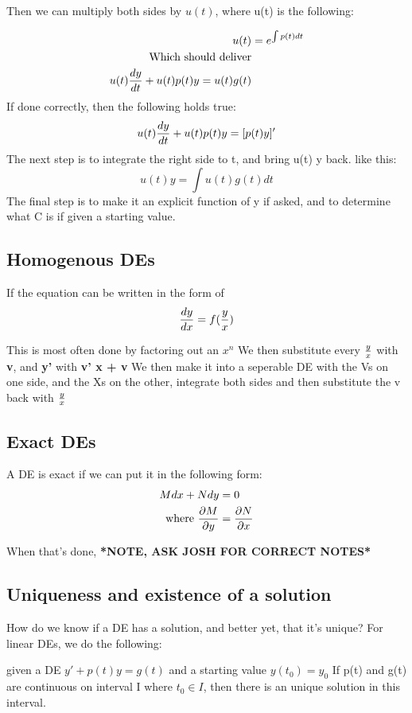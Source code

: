 \documentclass[17pt]{extarticle} %
\begin{document}
Then we can multiply both sides by $u(t)$, where u(t) is the following:  

$$
\begin{aligned}
u(t) &= e^{\int p(t)dt} \\
\text{Which should deliver} \\
u(t) {dy\over dt} + u(t) p(t) y = u(t) g(t)   
\end{aligned}
$$
If done correctly, then the following holds true:
$$
u(t) {dy\over dt} + u(t) p(t) y = [p(t) y]'
$$
The next step is to integrate the right side to t, and bring u(t) y back. 
like this:
$$
u(t) y = \int u(t) g(t) dt
$$
The final step is to make it an explicit function of y if asked, and to determine what C is if given a starting value.

\subsection{Homogenous DEs}
If the equation can be written in the form of 
$$
{dy \over dx} = f({y \over x})
$$

This is most often done by factoring out an $x^n$
We then substitute every \textbf{${y\over x}$} with \textbf{v}, and \textbf{y'} with \textbf{v' x + v}
We then make it into a seperable DE with the Vs on one side, and the Xs on the other, integrate both sides and then substitute the v back with ${y \over x}$
\subsection{Exact DEs}
A DE is exact if we can put it in the following form:
$$
\begin{aligned}
    M dx + N dy &= 0\\
    \text{where } \frac{\partial M}{\partial y} &= {\partial N \over \partial x}
\end{aligned}
$$


When that's done, 
\textbf{*NOTE, ASK JOSH FOR CORRECT NOTES*}


\subsection{Uniqueness and existence of a solution}
How do we know if a DE has a solution, and better yet, that it's unique?
For linear DEs, we do the following:

\begin{theorem}
    given a DE $y' + p(t)y = g(t)$ and a starting value $y(t_0) = y_0$
    If p(t) and g(t) are continuous on interval I where $t_0 \in I$, then there is 
    an unique solution in this interval. 
\end{theorem}
\end{document}
